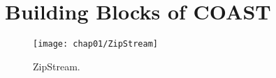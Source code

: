 \chapter{Building Blocks of COAST}\label{BuildingBlocks}

\begin{figure}[hbt]
  \centering
  \texttt{[image: chap01/ZipStream]}
  \caption{ZipStream.}
  \label{fig:zipstream}
\end{figure}



